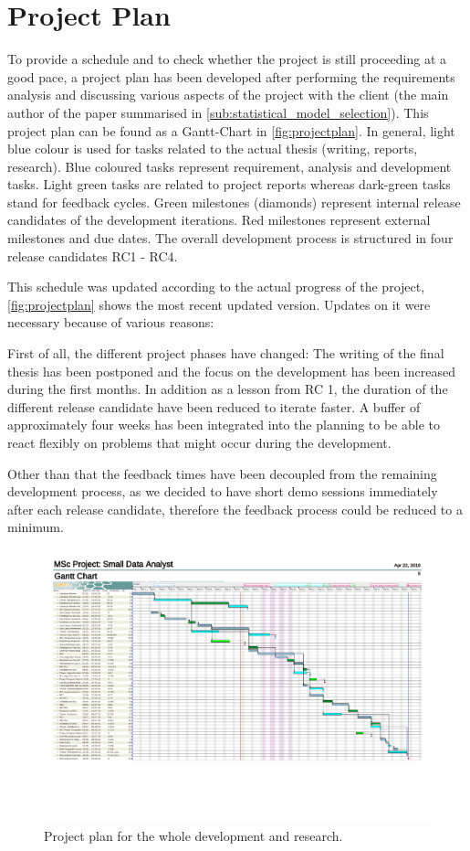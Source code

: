 \section{Project Plan}
\label{sec:projectplan}
To provide a schedule and to check whether the project is still proceeding at a good pace, a project plan has been developed after performing the requirements analysis and discussing various aspects of the project with the client (the main author of the paper summarised in \autoref{sub:statistical_model_selection}). This project plan can be found as a Gantt-Chart in \autoref{fig:projectplan}. In general, light blue colour is used for tasks related to the actual thesis (writing, reports, research). Blue coloured tasks represent requirement, analysis and development tasks. Light green tasks are related to project reports whereas dark-green tasks stand for feedback cycles. Green milestones (diamonds) represent internal release candidates of the development iterations. Red milestones represent external milestones and due dates. The overall development process is structured in four release candidates RC1 - RC4. 

This schedule was updated according to the actual progress of the project, \autoref{fig:projectplan} shows the most recent updated version. Updates on it were necessary because of various reasons:

First of all, the different project phases have changed: The writing of the final thesis has been postponed and the focus on the development has been increased during the first months. In addition as a lesson from RC 1, the duration of the different release candidate have been reduced to iterate faster. A buffer of approximately four weeks has been integrated into the planning to be able to react flexibly on problems that might occur during the development. 

Other than that the feedback times have been decoupled from the remaining development process, as we decided to have short demo sessions immediately after each release candidate, therefore the feedback process could be reduced to a minimum.

\begin{figure}
	\centering
	\includegraphics[width=\textwidth]{appendix/Projectplan}
	\caption{Project plan for the whole development and research.}
	\label{fig:projectplan}
\end{figure}
\restoregeometry